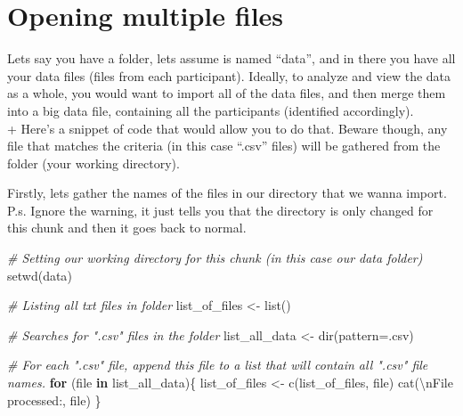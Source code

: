 \documentclass[
]{book}
\newenvironment{Shaded}{\begin{snugshade}}{\end{snugshade}}
\newcommand{\AttributeTok}[1]{\textcolor[rgb]{0.77,0.63,0.00}{#1}}
\newcommand{\CommentTok}[1]{\textcolor[rgb]{0.56,0.35,0.01}{\textit{#1}}}
\newcommand{\ControlFlowTok}[1]{\textcolor[rgb]{0.13,0.29,0.53}{\textbf{#1}}}
\newcommand{\FunctionTok}[1]{\textcolor[rgb]{0.00,0.00,0.00}{#1}}
\newcommand{\NormalTok}[1]{#1}
\newcommand{\OtherTok}[1]{\textcolor[rgb]{0.56,0.35,0.01}{#1}}
\newcommand{\SpecialCharTok}[1]{\textcolor[rgb]{0.00,0.00,0.00}{#1}}
\newcommand{\StringTok}[1]{\textcolor[rgb]{0.31,0.60,0.02}{#1}}
\begin{document}
\hypertarget{opening-multiple-files}{%
\section{Opening multiple files}\label{opening-multiple-files}}

Lets say you have a folder, lets assume is named ``data'', and in there you have all your data files (files from each participant). Ideally, to analyze and view the data as a whole, you would want to import all of the data files, and then merge them into a big data file, containing all the participants (identified accordingly).\\
+
Here's a snippet of code that would allow you to do that. Beware though, any file that matches the criteria (in this case ``.csv'' files) will be gathered from the folder (your working directory).

Firstly, lets gather the names of the files in our directory that we wanna import.\\
P.s. Ignore the warning, it just tells you that the directory is only changed for this chunk and then it goes back to normal.

\begin{Shaded}
\begin{Highlighting}[]
\CommentTok{\# Setting our working directory for this chunk (in this case our data folder)}
\FunctionTok{setwd}\NormalTok{(}\StringTok{\textquotesingle{}data\textquotesingle{}}\NormalTok{)}

\CommentTok{\# Listing all txt files in folder}
\NormalTok{list\_of\_files }\OtherTok{\textless{}{-}} \FunctionTok{list}\NormalTok{()}

\CommentTok{\# Searches for ".csv" files in the folder}
\NormalTok{list\_all\_data }\OtherTok{\textless{}{-}} \FunctionTok{dir}\NormalTok{(}\AttributeTok{pattern=}\StringTok{\textquotesingle{}.csv\textquotesingle{}}\NormalTok{)}

\CommentTok{\# For each ".csv" file, append this file to a list that will contain all ".csv" file names.}
\ControlFlowTok{for}\NormalTok{ (file }\ControlFlowTok{in}\NormalTok{ list\_all\_data)\{}
\NormalTok{  list\_of\_files }\OtherTok{\textless{}{-}} \FunctionTok{c}\NormalTok{(list\_of\_files, file)}
  \FunctionTok{cat}\NormalTok{(}\StringTok{\textquotesingle{}}\SpecialCharTok{\textbackslash{}n}\StringTok{File processed:\textquotesingle{}}\NormalTok{, file)}
\NormalTok{\}}
\end{Highlighting}
\end{Shaded}
\end{document}
